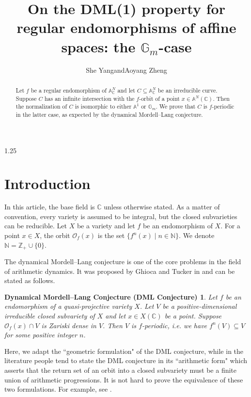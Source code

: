 \documentclass[12pt]{article}
\title{\textbf{On the DML(1) property for regular endomorphisms of affine spaces: the $\mathbb{G}_m$-case}}
\author{She Yang\quad and\quad Aoyang Zheng}
\date{}
\newtheorem*{DML}{Dynamical Mordell--Lang Conjecture (DML Conjecture)}
\begin{document}
\begin{spacing}{1.25}

\maketitle

\begin{abstract}
Let $f$ be a regular endomorphism of $\mathbb{A}_{\mathbb{C}}^N$ and let $C\subseteq\mathbb{A}_{\mathbb{C}}^N$ be an irreducible curve. Suppose $C$ has an infinite intersection with the $f$-orbit of a point $x\in\mathbb{A}^N(\mathbb{C})$. Then the normalization of $C$ is isomorphic to either $\mathbb{A}^1$ or $\mathbb{G}_m$. We prove that $C$ is $f$-periodic in the latter case, as expected by the dynamical Mordell--Lang conjecture.
\end{abstract}










\section{Introduction}

In this article, the base field is $\mathbb{C}$ unless otherwise stated. As a matter of convention, every variety is assumed to be integral, but the closed subvarieties can be reducible. Let $X$ be a variety and let $f$ be an endomorphism of $X$. For a point $x\in X$, the orbit $\mathcal{O}_{f}(x)$ is the set $\{f^{n}(x)\mid n\in\mathbb{N}\}$. We denote $\mathbb{N}=\mathbb{Z}_{+}\cup\{0\}$.

The dynamical Mordell--Lang conjecture is one of the core problems in the field of arithmetic dynamics. It was proposed by Ghioca and Tucker in \cite{GT09} and can be stated as follows.

\begin{DML}
Let $f$ be an endomorphism of a quasi-projective variety $X$. Let $V$ be a positive-dimensional irreducible closed subvariety of $X$ and let $x\in X(\mathbb{C})$ be a point. Suppose $\mathcal{O}_f(x)\cap V$ is Zariski dense in $V$. Then $V$ is $f$-periodic, i.e. we have $f^n(V)\subseteq V$ for some positive integer $n$.
\end{DML}

Here, we adapt the ``geometric formulation" of the DML conjecture, while in the literature people tend to state the DML conjecture in its ``arithmetic form" which asserts that the return set of an orbit into a closed subvariety must be a finite union of arithmetic progressions. It is not hard to prove the equivalence of these two formulations. For example, see \cite[Subsection 3.1.3]{BGT16}.


\end{spacing}
\end{document}
